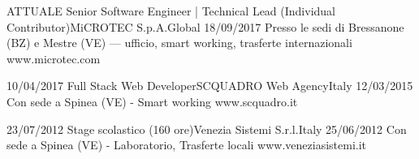 
\begin{experiences}
    \experience
    {ATTUALE} {Senior Software Engineer | Technical Lead (Individual Contributor)}{MiCROTEC S.p.A.}{Global}
    {18/09/2017} {Presso le sedi di Bressanone (BZ) e Mestre (VE) — ufficio, smart working, trasferte internazionali}
    {www.microtec.com}
    \emptySeparator

    \experience
    {10/04/2017} {Full Stack Web Developer}{SCQUADRO Web Agency}{Italy}
    {12/03/2015} {Con sede a Spinea (VE) - Smart working}
    {www.scquadro.it}
    \emptySeparator

    \experience
    {23/07/2012} {Stage scolastico (160 ore)}{Venezia Sistemi S.r.l.}{Italy}
    {25/06/2012} {Con sede a Spinea (VE) - Laboratorio, Trasferte locali}
    {www.veneziasistemi.it}
\end{experiences}
